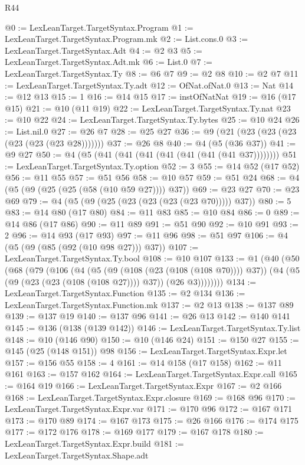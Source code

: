 \begin{lexlean}{R44}
\begin{coremodule}
@0 := LexLeanTarget.TargetSyntax.Program
@1 := LexLeanTarget.TargetSyntax.Program.mk
@2 := List.cons.{0}
@3 := LexLeanTarget.TargetSyntax.Adt
@4 := @2 @3
@5 := LexLeanTarget.TargetSyntax.Adt.mk
@6 := List.{0}
@7 := LexLeanTarget.TargetSyntax.Ty
@8 := @6 @7
@9 := @2 @8
@10 := @2 @7
@11 := LexLeanTarget.TargetSyntax.Ty.adt
@12 := OfNat.ofNat.{0}
@13 := Nat
@14 := @12 @13
@15 := 1
@16 := @14 @15
@17 := instOfNatNat
@19 := @16 (@17 @15)
@21 := @10 (@11 @19)
@22 := LexLeanTarget.TargetSyntax.Ty.nat
@23 := @10 @22
@24 := LexLeanTarget.TargetSyntax.Ty.bytes
@25 := @10 @24
@26 := List.nil.{0}
@27 := @26 @7
@28 := @25 @27
@36 := @9 (@21 (@23 (@23 (@23 (@23 (@23 (@23 @28)))))))
@37 := @26 @8
@40 := @4 (@5 (@36 @37))
@41 := @9 @27
@50 := @4 (@5 (@41 (@41 (@41 (@41 (@41 (@41 (@41 @37))))))))
@51 := LexLeanTarget.TargetSyntax.Ty.option
@52 := 3
@55 := @14 @52 (@17 @52)
@56 := @11 @55
@57 := @51 @56
@58 := @10 @57
@59 := @51 @24
@68 := @4 (@5 (@9 (@25 (@25 (@58 (@10 @59 @27)))) @37))
@69 := @23 @27
@70 := @23 @69
@79 := @4 (@5 (@9 (@25 (@23 (@23 (@23 (@23 @70))))) @37))
@80 := 5
@83 := @14 @80 (@17 @80)
@84 := @11 @83
@85 := @10 @84
@86 := 0
@89 := @14 @86 (@17 @86)
@90 := @11 @89
@91 := @51 @90
@92 := @10 @91
@93 := 2
@96 := @14 @93 (@17 @93)
@97 := @11 @96
@98 := @51 @97
@106 := @4 (@5 (@9 (@85 (@92 (@10 @98 @27))) @37))
@107 := LexLeanTarget.TargetSyntax.Ty.bool
@108 := @10 @107
@133 := @1
    (@40
      (@50
        (@68
          (@79
            (@106
              (@4
                (@5 (@9 (@108 (@23 (@108 (@108 @70)))) @37))
                (@4 (@5 (@9 (@23 (@23 (@108 (@108 @27)))) @37)) (@26 @3))))))))
@134 := LexLeanTarget.TargetSyntax.Function
@135 := @2 @134
@136 := LexLeanTarget.TargetSyntax.Function.mk
@137 := @2 @13
@138 := @137 @89
@139 := @137 @19
@140 := @137 @96
@141 := @26 @13
@142 := @140 @141
@145 := @136 (@138 (@139 @142))
@146 := LexLeanTarget.TargetSyntax.Ty.list
@148 := @10 (@146 @90)
@150 := @10 (@146 @24)
@151 := @150 @27
@155 := @145 (@25 (@148 @151)) @98
@156 := LexLeanTarget.TargetSyntax.Expr.let
@157 := @156 @55
@158 := 4
@161 := @14 @158 (@17 @158)
@162 := @11 @161
@163 := @157 @162
@164 := LexLeanTarget.TargetSyntax.Expr.call
@165 := @164 @19
@166 := LexLeanTarget.TargetSyntax.Expr
@167 := @2 @166
@168 := LexLeanTarget.TargetSyntax.Expr.closure
@169 := @168 @96
@170 := LexLeanTarget.TargetSyntax.Expr.var
@171 := @170 @96
@172 := @167 @171
@173 := @170 @89
@174 := @167 @173
@175 := @26 @166
@176 := @174 @175
@177 := @172 @176
@178 := @169 @177
@179 := @167 @178
@180 := LexLeanTarget.TargetSyntax.Expr.build
@181 := LexLeanTarget.TargetSyntax.Shape.adt

\end{coremodule}
\end{lexlean}
